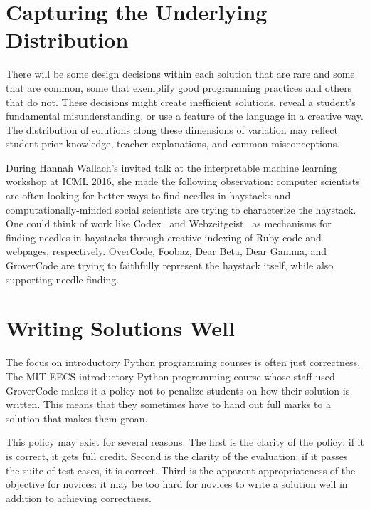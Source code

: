 \section{Capturing the Underlying Distribution}

There will be some design decisions within each solution that are rare and some that are common, some that exemplify good programming practices and others that do not. These decisions might create inefficient solutions, reveal a student's fundamental misunderstanding, or use a feature of the language in a creative way. The distribution of solutions along these dimensions of variation may reflect student prior knowledge, teacher explanations, and common misconceptions. 

During Hannah Wallach's invited talk at the interpretable machine learning workshop at ICML 2016, she made the following observation: computer scientists are often looking for better ways to find needles in haystacks and computationally-minded social scientists are trying to characterize the haystack. One could think of work like Codex~\cite{codex} and Webzeitgeist~\cite{webzeitgeist} as mechanisms for finding needles in haystacks through creative indexing of Ruby code and webpages, respectively. OverCode, Foobaz, Dear Beta, Dear Gamma, and GroverCode are trying to faithfully represent the haystack itself, while also supporting needle-finding. 

\section{Writing Solutions Well}

The focus on introductory Python programming courses is often just correctness. The MIT EECS introductory Python programming course whose staff used GroverCode makes it a policy not to penalize students on how their solution is written. This means that they sometimes have to hand out full marks to a solution that makes them groan.

This policy may exist for several reasons. The first is the clarity of the policy: if it is correct, it gets full credit. Second is the clarity of the evaluation: if it passes the suite of test cases, it is correct. Third is the apparent appropriateness of the objective for novices: it may be too hard for novices to write a solution well in addition to achieving correctness. %

